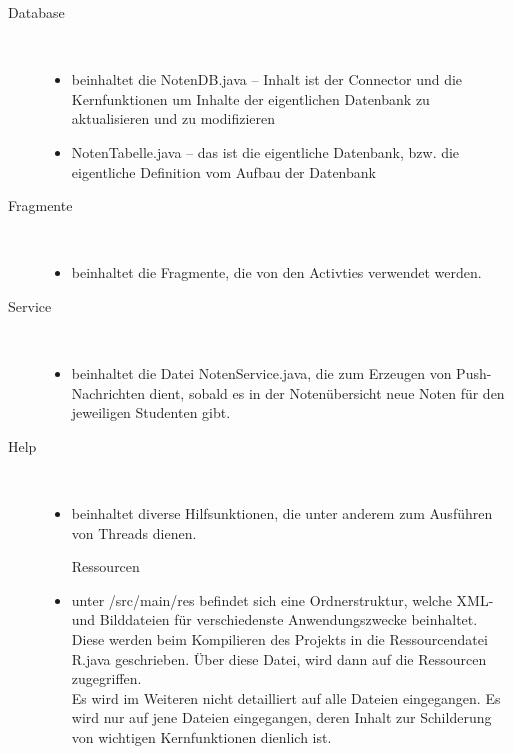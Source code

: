 \newpage

\begin{description}
\item[Database]~\par
\begin{itemize}
\item beinhaltet die NotenDB.java – Inhalt ist der Connector und die Kernfunktionen um Inhalte der eigentlichen Datenbank zu aktualisieren und zu modifizieren
\item NotenTabelle.java – das ist die eigentliche Datenbank, bzw. die eigentliche Definition vom Aufbau der Datenbank
\end{itemize}

 
\item[Fragmente]~\par
\begin{itemize}
\item beinhaltet die Fragmente, die von den Activties verwendet werden.
\end{itemize}

\item[Service]~\par
\begin{itemize}
\item beinhaltet die Datei NotenService.java, die zum Erzeugen von Push-Nachrichten dient, sobald es in der Notenübersicht neue Noten für den jeweiligen Studenten gibt.
\end{itemize}

 
\item[Help]~\par
\begin{itemize}
\item beinhaltet diverse Hilfsunktionen, die unter anderem zum Ausführen von Threads dienen.
\item[Ressourcen]~\par
\item unter /src/main/res befindet sich eine Ordnerstruktur, welche XML- und Bilddateien für verschiedenste Anwendungszwecke beinhaltet. Diese werden beim Kompilieren des Projekts in die Ressourcendatei R.java geschrieben. Über diese Datei, wird dann auf die Ressourcen zugegriffen. \\
Es wird im Weiteren nicht detailliert auf alle Dateien eingegangen. Es wird nur auf jene Dateien eingegangen, deren Inhalt zur Schilderung von wichtigen Kernfunktionen dienlich ist.
\end{itemize}


\end{description}
